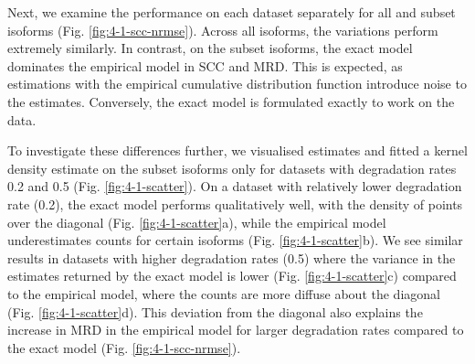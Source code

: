 \begin{table}[htbp]
\centering
\caption[Summary of metrics across simulated datasets for model variations]{Summary of metrics across simulated datasets for model variations. We report the mean SCC, NRMSE and MRD across the five datasets for all isoforms and subset isoforms separately. Bold values indicate the best performance for each column.}
\label{tab:summary-1}
\end{table}%

Next, we examine the performance on each dataset separately for all and subset isoforms (Fig. \ref{fig:4-1-scc-nrmse}). Across all isoforms, the variations perform extremely similarly. In contrast, on the subset isoforms, the exact model dominates the empirical model in SCC and MRD. This is expected, as estimations with the empirical cumulative distribution function introduce noise to the estimates. Conversely, the exact model is formulated exactly to work on the data. 

To investigate these differences further, we visualised estimates and fitted a kernel density estimate on the subset isoforms only for datasets with degradation rates 0.2 and 0.5 (Fig. \ref{fig:4-1-scatter}). On a dataset with relatively lower degradation rate (0.2), the exact model performs qualitatively well, with the density of points over the diagonal (Fig. \ref{fig:4-1-scatter}a), while the empirical model underestimates counts for certain isoforms (Fig. \ref{fig:4-1-scatter}b). We see similar results in datasets with higher degradation rates (0.5) where the variance in the estimates returned by the exact model is lower (Fig. \ref{fig:4-1-scatter}c) compared to the empirical model, where the counts are more diffuse about the diagonal (Fig. \ref{fig:4-1-scatter}d). This deviation from the diagonal also explains the increase in MRD in the empirical model for larger degradation rates compared to the exact model (Fig. \ref{fig:4-1-scc-nrmse}).

